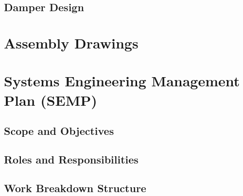 \documentclass[a4paper,10pt]{article} %
\begin{document}
\newpage

\subsection{Damper Design}

\newpage

\section{Assembly Drawings}

\newpage

\section{Systems Engineering Management Plan (SEMP)}

\subsection{Scope and Objectives}



\subsection{Roles and Responsibilities}



\newpage

\subsection{Work Breakdown Structure}

\end{document}
